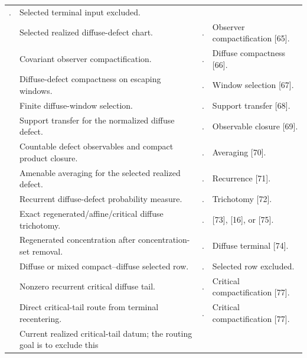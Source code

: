 \documentclass[11pt]{amsart}
\numberwithin{equation}{section}
\theoremstyle{plain}
\theoremstyle{definition}
\theoremstyle{remark}
\begin{document}
\begin{longtable}{@{}L{0.06\textwidth}L{0.25\textwidth}L{0.40\textwidth}L{0.21\textwidth}@{}}
. &
Selected terminal input excluded.\\
\relax
[64] & Selected realized diffuse-defect chart. &
. & Observer compactification [65].\\
\relax
[65] & Covariant observer compactification. &
. & Diffuse compactness [66].\\
\relax
[66] & Diffuse-defect compactness on escaping windows. &
. & Window selection [67].\\
\relax
[67] & Finite diffuse-window selection. &
. & Support transfer [68].\\
\relax
[68] & Support transfer for the normalized diffuse defect. &
. & Observable closure [69].\\
\relax
[69] & Countable defect observables and compact product closure. &
. & Averaging [70].\\
\relax
[70] & Amenable averaging for the selected realized defect. &
. & Recurrence [71].\\
\relax
[71] & Recurrent diffuse-defect probability measure. &
. & Trichotomy [72].\\
\relax
[72] & Exact regenerated/affine/critical diffuse trichotomy. &
. & [73], [16], or [75].\\
\relax
[73] & Regenerated concentration after concentration-set removal. &
. & Diffuse terminal [74].\\
\relax
[74] & Diffuse or mixed compact--diffuse selected row. &
. &
Selected row excluded.\\
\relax
[75] & Nonzero recurrent critical diffuse tail. &
. & Critical compactification [77].\\
\relax
[76] & Direct critical-tail route from terminal recentering. &
. & Critical compactification [77].\\
\relax
[77] & Current realized critical-tail datum; the routing goal is to exclude this

\end{longtable}
\end{document}
